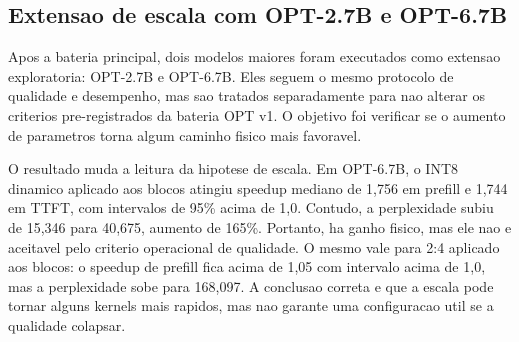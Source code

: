 \documentclass[12pt, a4paper]{article}
\begin{document}
\subsection{Extensao de escala com OPT-2.7B e OPT-6.7B}

Apos a bateria principal, dois modelos maiores foram executados como extensao
exploratoria: OPT-2.7B e OPT-6.7B. Eles seguem o mesmo protocolo de qualidade e
desempenho, mas sao tratados separadamente para nao alterar os criterios
pre-registrados da bateria OPT v1. O objetivo foi verificar se o aumento de
parametros torna algum caminho fisico mais favoravel.

\begin{table}[H]
\centering
\caption{Qualidade e desempenho em modelos OPT maiores}
\end{table}

O resultado muda a leitura da hipotese de escala. Em OPT-6.7B, o INT8 dinamico
aplicado aos blocos atingiu speedup mediano de 1,756 em prefill e 1,744 em
TTFT, com intervalos de 95\% acima de 1,0. Contudo, a perplexidade subiu de
15,346 para 40,675, aumento de 165\%. Portanto, ha ganho fisico, mas ele nao e
aceitavel pelo criterio operacional de qualidade. O mesmo vale para 2:4 aplicado
aos blocos: o speedup de prefill fica acima de 1,05 com intervalo acima de 1,0,
mas a perplexidade sobe para 168,097. A conclusao correta e que a escala pode
tornar alguns kernels mais rapidos, mas nao garante uma configuracao util se a
qualidade colapsar.
\end{document}
